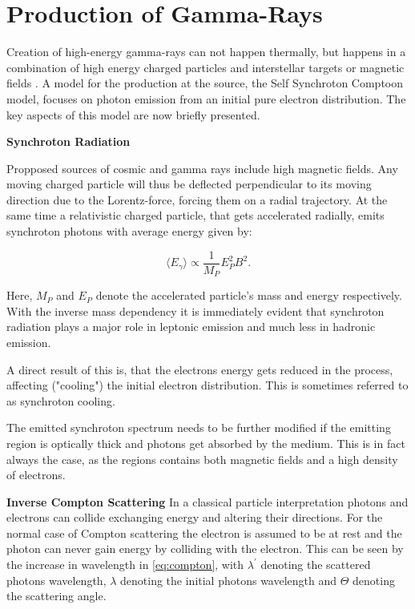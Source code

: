 \section{Production of Gamma-Rays}
Creation of high-energy gamma-rays can not happen thermally,
but happens in a combination of high energy charged particles 
and interstellar targets or magnetic fields \cite{funcray}.
A model for the production at the source, the Self Synchroton Comptoon model,
focuses on photon emission from an initial pure electron distribution.
The key aspects of this model are now briefly presented. 

\textbf{Synchroton Radiation}

Propposed sources of cosmic and gamma rays include 
high magnetic fields. Any moving charged particle will thus be
deflected perpendicular to its moving direction
due to the Lorentz-force, forcing them on a radial trajectory.
At the same time a relativistic charged particle, 
that gets accelerated radially, emits synchroton 
photons with average energy given by:

\begin{equation}
	\langle E_{\gamma} \rangle \propto \frac{1}{M_P} E_P^2 B^2.
	\label{eq:synchroton}
\end{equation}

Here, $M_P$ and $E_P$ denote the accelerated particle's 
mass and energy respectively. With the inverse mass dependency 
it is immediately evident that
synchroton radiation plays a major role in leptonic 
emission and much less in hadronic emission.

A direct result of this is, that the electrons energy gets reduced
in the process, affecting ("cooling") the initial electron distribution.
This is sometimes referred to as synchroton cooling.

The emitted synchroton spectrum needs to be further modified 
if the emitting region is optically thick and photons 
get absorbed by the medium.
This is in fact always the case, as the regions contains 
both magnetic fields and a high density of electrons.

\textbf{Inverse Compton Scattering}
In a classical particle interpretation photons and electrons 
can collide exchanging energy and altering their directions.
For the normal case of Compton scattering the electron 
is assumed to be at rest and the photon can never gain 
energy by colliding with the electron.
This can be 
seen by the increase in wavelength in \eqref{eq:compton},
with $\lambda^{\prime}$ denoting the scattered photons 
wavelength, $\lambda$ denoting the initial photons wavelength  
and $\Theta$ denoting the scattering angle.

